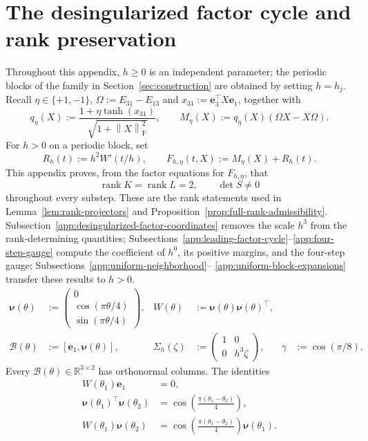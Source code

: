 \documentclass[10pt,a4paper]{amsart}
\numberwithin{equation}{section}
\newcommand{\F}{\mathrm F}
\newcommand{\norm}[1]{\left\lVert #1\right\rVert}
\newcommand{\rank}{\operatorname{rank}}
\begin{document}
\appendix
\section{The desingularized factor cycle and rank preservation}
\label{app:uniformity}

Throughout this appendix, $h\ge0$ is an independent parameter; the
periodic blocks of the family in Section~\ref{sec:construction} are
obtained by setting $h=h_j$.  Recall
$\eta\in\{+1,-1\}$,
$\Omega:=E_{31}-E_{13}$ and
$x_{31}:=\boldsymbol e_3^\top X\boldsymbol e_1$, together with
\[
 q_\eta(X):=\frac{1+\eta\tanh(x_{31})}
 {\sqrt{1+\norm{X}_{\F}^2}},
 \qquad M_\eta(X):=q_\eta(X)(\Omega X-X\Omega).
\]
For $h>0$ on a periodic block, set
\[
 R_h(t):=h^2W'(t/h),\qquad F_{h,\eta}(t,X):=M_\eta(X)+R_h(t).
\]
This appendix proves, from the factor equations for $F_{h,\eta}$, that
\[
 \rank K=\rank L=2,
 \qquad \det S\ne0
\]
throughout every substep.  These are the rank statements used in
Lemma~\ref{lem:rank-projectors} and
Proposition~\ref{prop:full-rank-admissibility}.  Subsection~\ref{app:desingularized-factor-coordinates}
removes the scale $h^3$ from the rank-determining quantities;
Subsections~\ref{app:leading-factor-cycle}--\ref{app:four-step-gauge}
compute the coefficient of $h^0$, its positive margins, and
the four-step gauge; Subsections~\ref{app:uniform-neighborhood}--
\ref{app:uniform-block-expansions} transfer these results to $h>0$.
\begin{equation}\label{eq:factor-definitions}
\begin{aligned}
 \boldsymbol\nu(\theta)&:=
 \begin{pmatrix}0\\ \cos(\pi\theta/4)\\ \sin(\pi\theta/4)\end{pmatrix},
 &W(\theta)&:=\boldsymbol\nu(\theta)\boldsymbol\nu(\theta)^\top,\\
 \mathcal B(\theta)&:=[\boldsymbol e_1,\boldsymbol\nu(\theta)],
 &\Sigma_h(\zeta)&:=\begin{pmatrix}1&0\\0&h^3\zeta\end{pmatrix},
 &\gamma&:=\cos(\pi/8).
\end{aligned}
\end{equation}
Every $\mathcal B(\theta)\in\mathbb R^{3\times2}$ has orthonormal columns.  The
identities
\begin{equation}\label{eq:nu-inner-product}
\begin{aligned}
 W(\theta_1)\boldsymbol e_1&=0,\\
 \boldsymbol\nu(\theta_1)^\top\boldsymbol\nu(\theta_2)
 &=\cos\!\left(\frac{\pi(\theta_1-\theta_2)}4\right),\\
 W(\theta_1)\boldsymbol\nu(\theta_2)
 &=\cos\!\left(\frac{\pi(\theta_1-\theta_2)}4\right)
 \boldsymbol\nu(\theta_1).
\end{aligned}
\end{equation}
\end{document}
